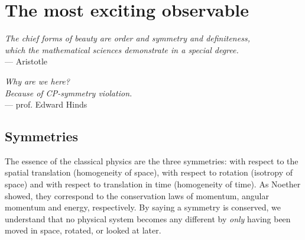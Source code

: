 \chapter{The most exciting observable}
\label{ch:nedm-at-psi}




\begin{flushright}{\slshape    
  The chief forms of beauty are order and symmetry and definiteness,\\
  which the mathematical sciences demonstrate in a special degree.} \\ \medskip
--- Aristotle
\end{flushright}

\bigskip

\begin{flushright}{\slshape    
  Why are we here?\\
  Because of CP-symmetry violation.} \\ \medskip
--- prof. Edward Hinds
\end{flushright}

\bigskip

\section{Symmetries}


The essence of the classical physics are the three symmetries: with respect to the spatial translation (homogeneity of space), with respect to rotation (isotropy of space) and with respect to translation in time (homogeneity of time). As Noether showed, they correspond to the conservation laws of momentum, angular momentum and energy, respectively. By saying a symmetry is conserved, we understand that no physical system becomes any different by \emph{only} having been moved in space, rotated, or looked at later.

